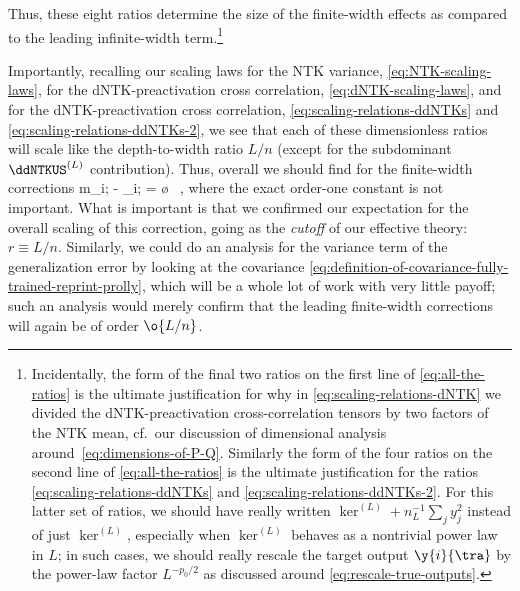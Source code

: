 Thus, these eight ratios
determine the size of the finite-width effects as compared to the leading infinite-width term.\footnote{Incidentally, the form of the final two ratios on the first line of \eqref{eq:all-the-ratios} is the ultimate justification for why in \eqref{eq:scaling-relations-dNTK} we divided the dNTK-preactivation cross-correlation tensors by two factors of the NTK mean, cf.~our discussion of dimensional analysis around~\eqref{eq:dimensions-of-P-Q}. Similarly the form of the four ratios on the second line of \eqref{eq:all-the-ratios}  is the ultimate justification for the ratios \eqref{eq:scaling-relations-ddNTKs} and \eqref{eq:scaling-relations-ddNTKs-2}. For this latter set of ratios, we should have really written $\ker^{(L)}+n_L^{-1}\sum_j y_j^2$ instead of just $\ker^{(L)}$, especially when $\ker^{(L)}$ behaves as a nontrivial power law in $L$; in such cases, we should really rescale the target output $\y{i}{\tra}$ by the power-law factor $L^{-p_0/2}$ as discussed around \eqref{eq:rescale-true-outputs}.
} 



Importantly, recalling our scaling laws for the NTK variance, \eqref{eq:NTK-scaling-laws}, for the dNTK-preactivation cross correlation, \eqref{eq:dNTK-scaling-laws}, and for the dNTK-preactivation cross correlation, \eqref{eq:scaling-relations-ddNTKs} and \eqref{eq:scaling-relations-ddNTKs-2}, we see that each of these dimensionless ratios will scale like the depth-to-width ratio $L/n$ (except for the subdominant $\ddNTKUS^{(L)}$ contribution).
Thus, overall we should find for the finite-width corrections
\be
m_{i;\tea} - \GDGPmean_{i;\tea} = \o{} \, ,
\ee
where the exact order-one constant is not important. What is important is that we confirmed our expectation for the overall scaling of this correction, going as the \emph{cutoff} of our effective theory: $r\equiv L/n$.
Similarly, we could do an analysis for the variance term of the generalization error by looking at the covariance \eqref{eq:definition-of-covariance-fully-trained-reprint-prolly}, which will be a whole lot of work with very little payoff; such an analysis would merely confirm that the leading finite-width corrections will again be of order $\o{L/n}$.

